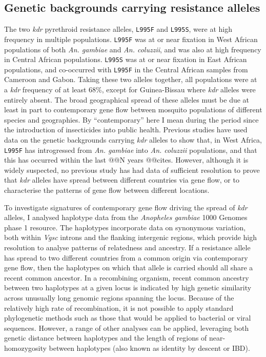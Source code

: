 \documentclass[a4paper,11pt,abstracton,hidelinks]{scrartcl}
\newcommand{\agam}{\textit{An. gambiae}\xspace}
\newcommand{\acol}{\textit{An. coluzzii}\xspace}
\newcommand{\vgsc}{\textit{Vgsc}\xspace}
\begin{document}
\subsection*{Genetic backgrounds carrying resistance alleles}


The two \textit{kdr} pyrethroid resistance alleles, \texttt{L995F} and \texttt{L995S}, were at high frequency in multiple populations.
%
\texttt{L995F} was at or near fixation in West African populations of both \agam and \acol, and was also at high frequency in Central African populations.
%
\texttt{L995S} was at or near fixation in East African populations, and co-occurred with \texttt{L995F} in the Central African samples from Cameroon and Gabon.
%
Taking these two alleles together, all populations were at a \textit{kdr} frequency of at least 68\%, except for Guinea-Bissau where \textit{kdr} alleles were entirely absent.
%
The broad geographical spread of these alleles must be due at least in part to contemporary gene flow between mosquito populations of different species and geographies.
%
By ``contemporary'' here I mean during the period since the introduction of insecticides into public health.
%
Previous studies have used data on the genetic backgrounds carrying \textit{kdr} alleles to show that, in West Africa, \texttt{L995F} has introgressed from \agam into \acol populations, and that this has occurred within the last @@N years @@cites.
%
However, although it is widely suspected, no previous study has had data of sufficient resolution to prove that \textit{kdr} alleles have spread between different countries via gene flow, or to characterise the patterns of gene flow between different locations.


To investigate signatures of contemporary gene flow driving the spread of \textit{kdr} alleles, I analysed haplotype data from the \textit{Anopheles gambiae} 1000 Genomes phase 1 resource.
%
The haplotypes incorporate data on synonymous variation, both within \vgsc introns and the flanking intergenic regions, which provide high resolution to analyse patterns of relatedness and ancestry.
%
If a resistance allele has spread to two different countries from a common origin via contemporary gene flow, then the haplotypes on which that allele is carried should all share a recent common ancestor.
%
In a recombining organism, recent common ancestry between two haplotypes at a given locus is indicated by high genetic similarity across unusually long genomic regions spanning the locus.
%
Because of the relatively high rate of recombination, it is not possible to apply standard phylogenetic methods such as those that would be applied to bacterial or viral sequences.
%
However, a range of other analyses can be applied, leveraging both genetic distance between haplotypes and the length of regions of near-homozygosity between haplotypes (also known as identity by descent or IBD).
\end{document}
